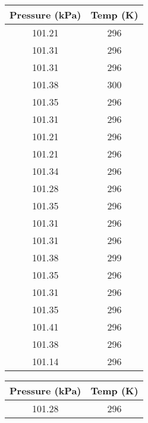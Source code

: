 \documentclass[conf]{new-aiaa}
\begin{document}
\begin{table}[ht]
    \centering
    \footnotesize
    \begin{minipage}{0.32\textwidth}
        \centering
        \begin{tabular}{||c c||}
            \hline
            Pressure (kPa) & Temp (K)  \\ [0.5ex]
            \hline\hline
            101.21 & 296 \\
            \hline
            101.31 & 296 \\
            \hline
            101.31 & 296 \\
            \hline
            101.38 & 300 \\
            \hline
            101.35 & 296 \\
            \hline
            101.31 & 296 \\
            \hline
            101.21 & 296 \\
            \hline
            101.21 & 296 \\
            \hline
            101.34 & 296 \\
            \hline
            101.28 & 296 \\
            \hline
            101.35 & 296 \\
            \hline
            101.31 & 296 \\
            \hline
            101.31 & 296 \\
            \hline
            101.38 & 299 \\
            \hline
            101.35 & 296 \\
            \hline
            101.31 & 296 \\
            \hline
            101.35 & 296 \\
            \hline
            101.41 & 296 \\
            \hline
            101.38 & 296 \\
            \hline
            101.14 & 296 \\
            \hline
        \end{tabular}
    \end{minipage}
    \hfill
    \begin{minipage}{0.32\textwidth}
        \centering
        \begin{tabular}{||c c||}
            \hline
            Pressure (kPa) & Temp (K)  \\ [0.5ex]
            \hline\hline
            101.28 & 296 \\

\end{tabular}
\end{minipage}
\end{table}
\end{document}
